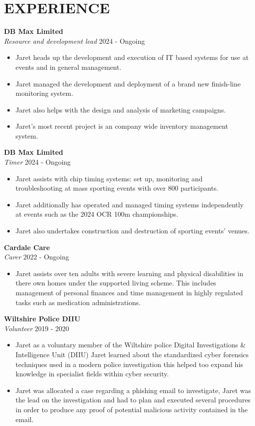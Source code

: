 \section*{EXPERIENCE}

\noindent
\textbf{DB Max Limited}\\
\textit{Resource and development lead} \hfill 2024 - Ongoing
\begin{itemize}
    \item Jaret heads up the development and execution of IT based systems for use at events and in general management.
    \item Jaret managed the development and deployment of a brand new finish-line monitoring system.
    \item Jaret also helps with the design and analysis of marketing campaigns.
    \item Jaret's most recent project is an company wide inventory management system.
\end{itemize}

\noindent
\textbf{DB Max Limited}\\
\textit{Timer} \hfill 2024 - Ongoing
\begin{itemize}
    \item Jaret assists with chip timing systems: set up, monitoring and troubleshooting at mass sporting events with over 800 participants.
    \item Jaret additionally has operated and managed timing systems independently at events such as the 2024 OCR 100m championships.
    \item Jaret also undertakes construction and destruction of sporting events' venues.
\end{itemize}

\noindent
\textbf{Cardale Care}\\
\textit{Carer} \hfill 2022 - Ongoing
\begin{itemize}
    \item Jaret assists over ten adults with severe learning and physical disabilities in there own homes under the supported living scheme. This includes management of personal finances and time management in highly regulated tasks such as medication administrations.
\end{itemize}

\noindent
\textbf{Wiltshire Police DIIU}\\
\textit{Volunteer} \hfill 2019 - 2020 
\begin{itemize}
    \item Jaret as a voluntary member of the Wiltshire police Digital Investigations \& Intelligence Unit (DIIU) Jaret learned about the standardized cyber forensics techniques used in a modern police investigation this helped too expand his knowledge in specialist fields within cyber security.
    \item Jaret was allocated a case regarding a phishing email to investigate, Jaret was the lead on the investigation and had to plan and executed several procedures in order to produce any proof of potential malicious activity contained in the email.
\end{itemize}

